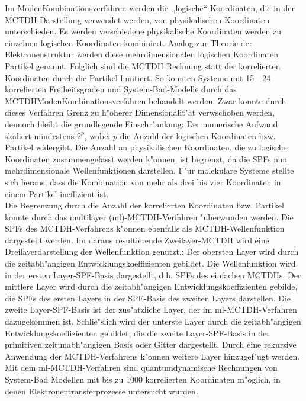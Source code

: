 Im Moden\-Kombinations\-verfah\-ren werden die ,,logische`` Koordinaten, die in der MCTDH-Darstellung verwendet werden, von physikalischen Koordinaten unterschieden. 
Es werden verschiedene physikalische Koordinaten werden zu einzelnen logischen Koordinaten kombiniert.
Analog zur Theorie der Elektronenstruktur werden diese mehrdimensionalen logischen Koordinaten Partikel genannt. 
Folglich sind die MCTDH Rechnung statt der korrelierten Koordinaten durch die Partikel limitiert. 
So konnten Systeme mit 15 - 24 korrelierten Freiheitsgraden \cite{H5O2+MCTDH2, H5O2+MCTDH3, RWMC, CWMC}
und System-Bad-Modelle \cite{W, WTM, NM2} durch das MCTDH\-Moden\-Kombinations\-verfahren behandelt werden.
Zwar konnte durch dieses Verfahren Grenz zu h"oherer Dimensionalit"at verwschoben werden,
 dennoch bleibt die grundlegende Einschr"ankung: Der numerische Aufwand skaliert mindestens $2^p$, wobei $ p $ die Anzahl der logischen Koordinaten bzw.
 Partikel widergibt. Die Anzahl an physikalischen Koordinaten, die zu logische Koordinaten zusammengefasst werden k"onnen, ist begrenzt, da die SPFs
 nun mehrdimensionale Wellenfunktionen darstellen. F"ur molekulare Systeme stellte sich heraus, dass die Kombination von mehr als drei bis vier Koordinaten in einem Partikel
ineffizient ist.
 \\Die Begrenzung durch die Anzahl der korrelierten Koordinaten bzw. Partikel konnte durch das multilayer (ml)-MCTDH-Verfahren \cite{WT3} "uberwunden werden.
Die SPFs des MCTDH-Verfahrens k"onnen ebenfalls als MCTDH-Wellenfunktion dargestellt werden.
Im daraus resultierende Zweilayer-MCTDH wird eine Dreilayerdarstellung der Wellenfunktion genutzt.:
Der obersten Layer wird durch die zeitabh"angigen Entwicklungskoeffizienten gebildet. Die Wellenfunktion wird in der ersten Layer-SPF-Basis dargestellt, d.h.
SPFs des einfachen MCTDHs. Der mittlere Layer wird durch die zeitabh"angigen Entwicklungskoeffizienten gebilde, die SPFs des ersten Layers in der
SPF-Basis des zweiten Layers darstellen. Die zweite Layer-SPF-Basis ist der zus"atzliche Layer, der im ml-MCTDH-Verfahren dazugekommen ist.
Schlie"slich wird der unterste Layer durch die zeitabh"angigen Entwicklungskoeffizienten gebildet, die die zweite Layer-SPF-Basis in der 
primitiven zeitunabh"angigen Basis oder Gitter dargestellt.
Durch eine rekursive Anwendung der MCTDH-Verfahrens k"onnen weitere Layer hinzugef"ugt werden.
Mit dem ml-MCTDH-Verfahren sind quantumdynamische Rechnungen von System-Bad Modellen mit bis zu 1000 korrelierten Koordinaten m"oglich,
in denen Elektronentransferprozesse \cite{WT3, WST} untersucht wurden.
